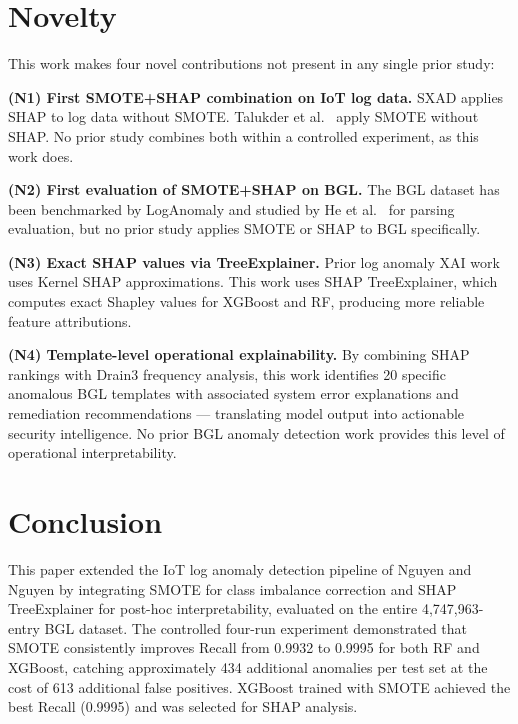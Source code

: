 \documentclass[conference]{IEEEtran}
\begin{document}
\section{Novelty}
\label{sec:novelty}

This work makes four novel contributions not present in any single prior
study:

\textbf{(N1) First SMOTE+SHAP combination on IoT log data.} SXAD
\cite{alam2024sxad} applies SHAP to log data without SMOTE. Talukder et al.\
\cite{talukder2024} apply SMOTE without SHAP. No prior study combines both
within a controlled experiment, as this work does.

\textbf{(N2) First evaluation of SMOTE+SHAP on BGL.} The BGL dataset has
been benchmarked by LogAnomaly \cite{meng2019loganomaly} and studied by
He et al.\ \cite{he2017drain} for parsing evaluation, but no prior study
applies SMOTE or SHAP to BGL specifically.

\textbf{(N3) Exact SHAP values via TreeExplainer.} Prior log anomaly XAI
work \cite{alam2024sxad} uses Kernel SHAP approximations. This work uses
SHAP TreeExplainer, which computes exact Shapley values for XGBoost and
RF, producing more reliable feature attributions.

\textbf{(N4) Template-level operational explainability.} By combining SHAP
rankings with Drain3 frequency analysis, this work identifies 20 specific
anomalous BGL templates with associated system error explanations and
remediation recommendations --- translating model output into actionable
security intelligence. No prior BGL anomaly detection work provides this
level of operational interpretability.

\section{Conclusion}
\label{sec:conclusion}

This paper extended the IoT log anomaly detection pipeline of Nguyen and
Nguyen \cite{nguyen2023} by integrating SMOTE \cite{chawla2002} for class
imbalance correction and SHAP TreeExplainer \cite{lundberg2017} for
post-hoc interpretability, evaluated on the entire 4{,}747{,}963-entry BGL
dataset. The controlled four-run experiment demonstrated that SMOTE
consistently improves Recall from 0.9932 to 0.9995 for both RF and XGBoost,
catching approximately 434 additional anomalies per test set at the cost of
613 additional false positives. XGBoost trained with SMOTE achieved the
best Recall (0.9995) and was selected for SHAP analysis.
\end{document}
